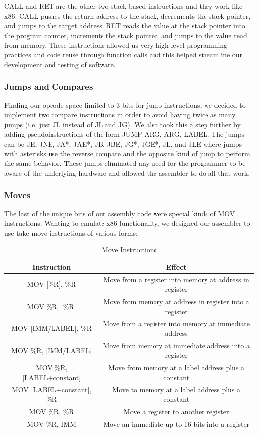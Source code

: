 \documentclass[onecolumn]{IEEEtran}
\begin{document}
CALL and RET are the other two stack-based instructions and they work like x86.  CALL pushes the return address to the stack, decrements the stack pointer, and jumps to the target address.  RET reads the value at the stack pointer into the program counter, increments the stack pointer, and jumps to the value read from memory.  These instructions allowed us very high level programming practices and code reuse through function calls and this helped streamline our development and testing of software. 

\subsubsection{Jumps and Compares}
Finding our opcode space limited to 3 bits for jump instructions, we decided to implement two compare instructions in order to avoid having twice as many jumps (i.e. just JL instead of JL and JG).  We also took this a step further by adding pseudoinstructions of the form JUMP ARG, ARG, LABEL.  The jumps can be JE, JNE, JA*, JAE*, JB, JBE, JG*, JGE*, JL, and JLE where jumps with asterisks use the reverse compare and the opposite kind of jump to perform the same behavior.  These jumps eliminated any need for the programmer to be aware of the underlying hardware and allowed the assembler to do all that work.

\subsubsection{Moves}
The last of the unique bits of our assembly code were special kinds of MOV instructions.  Wanting to emulate x86 functionality, we designed our assembler to use take move instructions of various forms: 

\begin{table}[H]
	\centering
	\label{tab:moveTypes}
	\caption{Move Instructions}
	\begin{tabular}{ c c }
	\hline
	Instruction               & Effect \\ \hline
	MOV [\%R], \%R            & Move from a register into memory at address in register \\
	MOV \%R, [\%R]            & Move from memory at address in register into a register \\	
	MOV [IMM/LABEL], \%R      & Move from a register into memory at immediate address \\ 
	MOV \%R, [IMM/LABEL]      & Move from memory at immediate address into a register \\  
	MOV \%R, [LABEL+constant] & Move from memory at a label address plus a constant \\  
	MOV [LABEL+constant], \%R & Move to memory at a label address plus a constant \\  
	MOV \%R, \%R              & Move a register to another register \\  
	MOV \%R, IMM              & Move an immediate up to 16 bits into a register \\  
	\hline
	\end{tabular}
\end{table}
\end{document}
